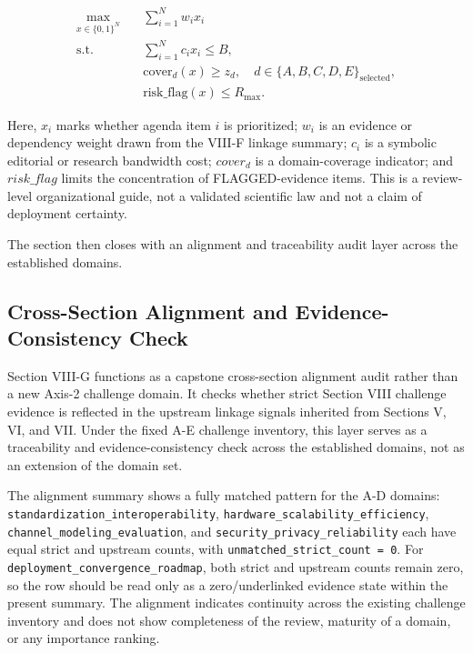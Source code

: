 \[
\begin{aligned}
\max_{x \in \{0,1\}^N}\quad & \sum_{i=1}^{N} w_i x_i \\
\text{s.t.}\quad & \sum_{i=1}^{N} c_i x_i \le B,\\
& \mathrm{cover}_d(x) \ge z_d,\quad d \in \{A,B,C,D,E\}_{\mathrm{selected}},\\
& \mathrm{risk\_flag}(x) \le R_{\max}.
\end{aligned}
\]

Here, $x_i$ marks whether agenda item $i$ is prioritized; $w_i$ is an evidence or dependency weight drawn from the VIII-F linkage summary; $c_i$ is a symbolic editorial or research bandwidth cost; $cover_d$ is a domain-coverage indicator; and $risk\_flag$ limits the concentration of FLAGGED-evidence items. This is a review-level organizational guide, not a validated scientific law and not a claim of deployment certainty.

The section then closes with an alignment and traceability audit layer across the established domains.

\subsection{Cross-Section Alignment and Evidence-Consistency Check}

Section VIII-G functions as a capstone cross-section alignment audit rather than a new Axis-2 challenge domain. It checks whether strict Section VIII challenge evidence is reflected in the upstream linkage signals inherited from Sections V, VI, and VII. Under the fixed A-E challenge inventory, this layer serves as a traceability and evidence-consistency check across the established domains, not as an extension of the domain set.

The alignment summary shows a fully matched pattern for the A-D domains: \texttt{standardization\_interoperability}, \texttt{hardware\_scalability\_efficiency}, \texttt{channel\_modeling\_evaluation}, and \texttt{security\_privacy\_reliability} each have equal strict and upstream counts, with \texttt{unmatched\_strict\_count = 0}. For \texttt{deployment\_convergence\_roadmap}, both strict and upstream counts remain zero, so the row should be read only as a zero/underlinked evidence state within the present summary. The alignment indicates continuity across the existing challenge inventory and does not show completeness of the review, maturity of a domain, or any importance ranking.


